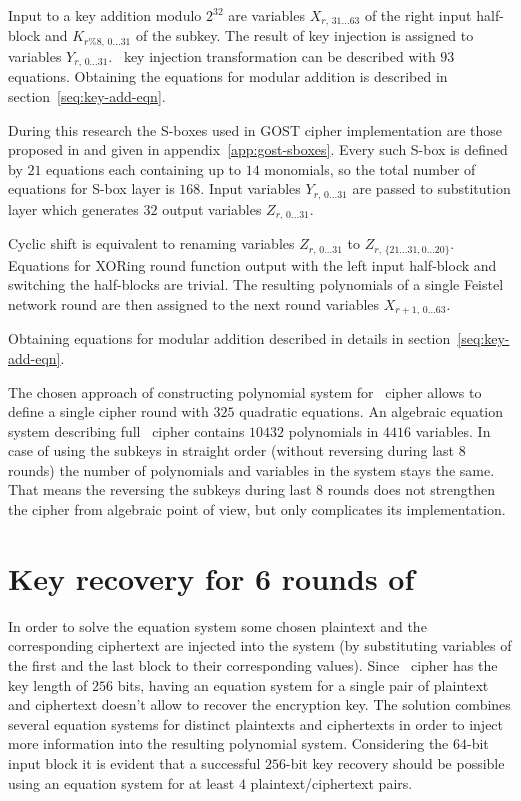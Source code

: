 Input to a key addition modulo $2^{32}$ are variables 
$X_{r, \, 31 \hdots 63}$ of the right input half-block and 
$K_{r \% 8, \, 0 \hdots 31}$ of the subkey. The result of key injection is
assigned to variables $Y_{r, \, 0 \hdots 31}$. \gost\ key injection
transformation can be described with $93$ equations. Obtaining the equations
for modular addition is described in section~\ref{seq:key-add-eqn}.

During this research the S-boxes used in GOST cipher implementation are those
proposed in \cite{GOST3411} and given in appendix~\ref{app:gost-sboxes}. Every
such S-box is defined by $21$ equations each containing up to $14$ monomials, so
the total number of equations for S-box layer is $168$.  Input variables 
$Y_{r, \, 0 \hdots 31}$ are passed to substitution layer which generates $32$ 
output variables $Z_{r, \, 0 \hdots 31}$.

Cyclic shift is equivalent to renaming variables $Z_{r, \, 0 \hdots 31}$ to 
$Z_{r, \, \{21 \hdots 31, 0 \hdots 20\}}$. Equations for XORing round function
output with the left input half-block and switching the half-blocks are
trivial. The resulting polynomials of a single Feistel network round are then
assigned to the next round variables $X_{r+1, \, 0 \hdots 63}$.

Obtaining equations for modular addition described in details in 
section~\ref{seq:key-add-eqn}.

The chosen approach of constructing polynomial system for \gost\ cipher
allows to define a single cipher round with $325$ quadratic equations. An
algebraic equation system describing full \gost\ cipher contains $10432$
polynomials in $4416$ variables. In case of using the subkeys in straight
order (without reversing during last $8$ rounds) the number of polynomials and
variables in the system stays the same. That means the reversing the subkeys
during last $8$ rounds does not strengthen the cipher from algebraic point of
view, but only complicates its implementation. 

\section{Key recovery for 6 rounds of \gost}
\label{sec:gost-key-rec}

In order to solve the equation system some chosen plaintext and the
corresponding ciphertext are injected into the system (by substituting
variables of the first and the last block to their corresponding values).
Since \gost\ cipher has the key length of $256$ bits, having an equation
system for a single pair of plaintext and ciphertext doesn't allow to recover
the encryption key. The solution combines several equation systems for
distinct plaintexts and ciphertexts in order to inject more information into
the resulting polynomial system. Considering the $64$-bit input block it is
evident that a successful $256$-bit key recovery should be possible using an
equation system for at least $4$ \mbox{plaintext/ciphertext} pairs.

